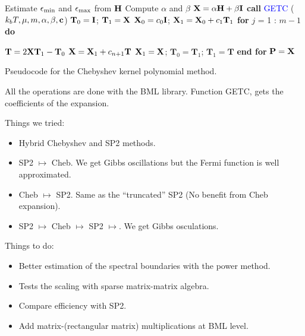 \begin{algorithm}[H]
  \algrenewcommand{}
  \begin{algorithmic}
    \parskip 0.05cm
    {\fontsize{0.3cm}{0.3em}\selectfont 
      \State Estimate $\epsilon_{\mathrm{min}}$ and $\epsilon_{\mathrm{max}}$ from $\textbf{H}$
      \State Compute $\alpha$ and $\beta$      
      \State $\textbf{X} = \alpha\textbf{H} + \beta \textbf{I}$
      \State \textbf{call} \textcolor{blue}{GETC} ($k_bT,\mu,m,\alpha,\beta,\textbf{c}$) 
      \State $\textbf{T}_0 = \textbf{I}$; $\textbf{T}_1 = \textbf{X}$
      \State $\textbf{X}_0 = c_0\textbf{I}$; $\textbf{X}_1 = \textbf{X}_0 + c_1\textbf{T}_1 $
      \State \textbf{for} $j$ = 1 : $m-1$ \textbf{do}
      
      \State \qquad \textcolor{red}{$\textbf{T} = 2\textbf{X}\textbf{T}_1 - \textbf{T}_{0}$}
      \State \qquad $\textbf{X} = \textbf{X}_1 + c_{n+1}\textbf{T}$
      \State \qquad $\textbf{X}_1 = \textbf{X}$; $\textbf{T}_{0} = \textbf{T}_{1}$; $\textbf{T}_{1} = \textbf{T}$  
      \State \textbf{end for}
      \State $\textbf{P} = \textbf{X}$
      \EndFunction
    }       
  \end{algorithmic}
  \label{pcode}
  \caption{Pseudocode for the Chebyshev kernel polynomial method.}
\end{algorithm}
All the operations are done with the BML library. Function GETC, gets the coefficients of the expansion. 



Things we tried:
\begin{itemize}
 \item Hybrid Chebyshev and SP2 methods. 
 \item SP2 $\longmapsto$ Cheb. We get Gibbs oscillations but the Fermi function is well approximated.
 \item Cheb $\longmapsto$ SP2. Same as the ``truncated'' SP2 (No benefit from Cheb expansion).
 \item SP2 $\longmapsto$ Cheb $\longmapsto$ SP2 $\longmapsto$. We get Gibbs osculations.   
\end{itemize}
Things to do:
\begin{itemize}
 \item Better estimation of the spectral boundaries with the power method.
 \item Tests the scaling with sparse matrix-matrix algebra. 
 \item Compare efficiency with SP2.
 \item Add matrix-(rectangular matrix) multiplications at BML level.
\end{itemize}

